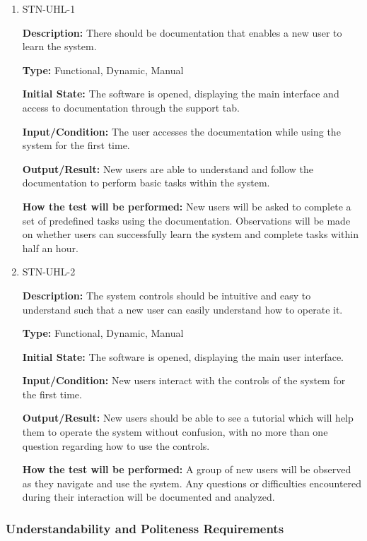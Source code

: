 \documentclass[12pt, titlepage]{article}
\begin{document}
\begin{enumerate}

\item{STN-UHL-1\\}

\textbf{Description:} There should be documentation that enables a new user to learn the system.

\textbf{Type:} Functional, Dynamic, Manual

\textbf{Initial State:} The software is opened, displaying the main interface and access to documentation through the support tab.

\textbf{Input/Condition:} The user accesses the documentation while using the system for the first time.

\textbf{Output/Result:} New users are able to understand and follow the documentation to perform basic tasks within the system.

\textbf{How the test will be performed:} New users will be asked to complete a set of predefined tasks using the documentation. Observations will be made on whether users can successfully learn the system and complete tasks within half an hour.

\item{STN-UHL-2\\}

\textbf{Description:} The system controls should be intuitive and easy to understand such that a new user can easily understand how to operate it.

\textbf{Type:} Functional, Dynamic, Manual

\textbf{Initial State:} The software is opened, displaying the main user interface.

\textbf{Input/Condition:} New users interact with the controls of the system for the first time.

\textbf{Output/Result:} New users should be able to see a tutorial which will help them to operate the system without confusion, with no more than one question regarding how to use the controls.

\textbf{How the test will be performed:} A group of new users will be observed as they navigate and use the system. Any questions or difficulties encountered during their interaction will be documented and analyzed.

\end{enumerate}

\subsubsection{Understandability and Politeness Requirements}
\end{document}
